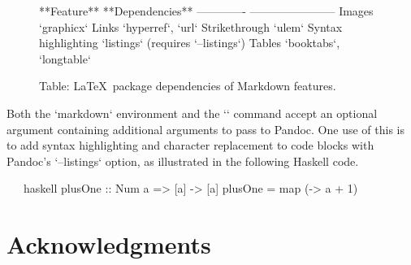 \documentclass{article}
\begin{document}

\begin{figure}[t]
\begin{markdown}
**Feature**          **Dependencies**
-------------        -----------------------
Images               `graphicx`
Links                `hyperref`, `url`
Strikethrough        `ulem`
Syntax highlighting  `listings` (requires `--listings`)
Tables               `booktabs`, `longtable`

Table: \LaTeX\ package dependencies of Markdown features. \label{tbl:dep} 
\end{markdown}
\end{figure}

\begin{markdown}
Both the `markdown` environment and the `\markd` command accept an optional
argument containing additional arguments to pass to Pandoc. One use of this is
to add syntax highlighting and character replacement to code blocks with
Pandoc's `--listings` option, as illustrated in the following Haskell code.
\end{markdown}

\begin{markdown}[--listings]
~~~haskell
plusOne :: Num a => [a] -> [a]
plusOne = map (\a -> a + 1)
~~~
\end{markdown}


\section*{Acknowledgments}
\label{sec:ack}
\end{document}
